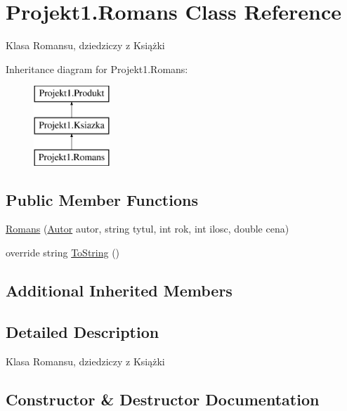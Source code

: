 \hypertarget{class_projekt1_1_1_romans}{}\section{Projekt1.\+Romans Class Reference}
\label{class_projekt1_1_1_romans}


Klasa Romansu, dziedziczy z Książki  


Inheritance diagram for Projekt1.\+Romans\+:\begin{figure}[H]
\begin{center}
\leavevmode
\includegraphics[height=3.000000cm]{class_projekt1_1_1_romans}
\end{center}
\end{figure}
\subsection*{Public Member Functions}
\begin{DoxyCompactItemize}
\item 
\mbox{\hyperlink{class_projekt1_1_1_romans_a483b7f91508b950bc68278ac5a88e15f}{Romans}} (\mbox{\hyperlink{class_projekt1_1_1_autor}{Autor}} autor, string tytul, int rok, int ilosc, double cena)
\item 
override string \mbox{\hyperlink{class_projekt1_1_1_romans_a30da5534f179120d2899e5afef641668}{To\+String}} ()
\end{DoxyCompactItemize}
\subsection*{Additional Inherited Members}


\subsection{Detailed Description}
Klasa Romansu, dziedziczy z Książki 



\subsection{Constructor \& Destructor Documentation}
\mbox{\label{class_projekt1_1_1_romans_a483b7f91508b950bc68278ac5a88e15f}} 
